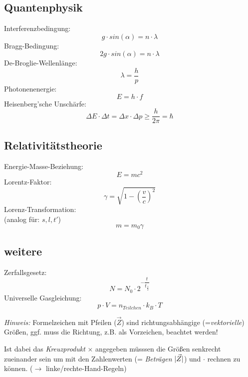 \documentclass[12pt,a4paper,oneside]{article}
\begin{document}
\begin{multicols}{3}
\subsection*{Quantenphysik}
Interferenzbedingung:
$$ g \cdot sin(\alpha) = n \cdot \lambda $$
Bragg-Bedingung:
$$ 2 g \cdot sin(\alpha) = n \cdot \lambda $$
De-Broglie-Wellenlänge:
$$ \lambda = \frac{h}{p} $$
Photonenenergie:
$$ E = h \cdot f $$
Heisenberg'sche Unschärfe:
$$ \Delta E \cdot \Delta t = \Delta x \cdot \Delta p \geq \frac{h}{2\pi} = \hbar $$

\subsection*{Relativitätstheorie}
Energie-Masse-Beziehung:
$$ E = mc^2 $$
Lorentz-Faktor:
$$ \gamma = \sqrt{1-\left(\frac{v}{c}\right)^2} $$
Lorenz-Transformation:\\
(analog für: $s, l, t'$)
$$ m = m_0 \gamma $$

\subsection*{weitere}
Zerfallsgesetz:
$$ N = N_0 \cdot 2^{-\dfrac{t}{t_{\frac{1}{2}}}} $$
Universelle Gasgleichung:
$$ p \cdot V = n_{Teilchen} \cdot k_B \cdot T $$


\end{multicols}
\emph{Hinweis:} Formelzeichen mit Pfeilen ($\vec{Z}$) sind richtungsabhängige (=\textit{vektorielle}) Größen, ggf. muss die Richtung, z.B. als Vorzeichen, beachtet werden!

Ist dabei das \textit{Kreuzprodukt} $\times$ angegeben müsssen die Größen senkrecht zueinander sein um mit den Zahlenwerten (= \textit{Beträgen} $\lvert\vec{Z}\rvert$) und $\cdot$ rechnen zu können. ($\rightarrow$ linke/rechte-Hand-Regeln)

\end{document}
